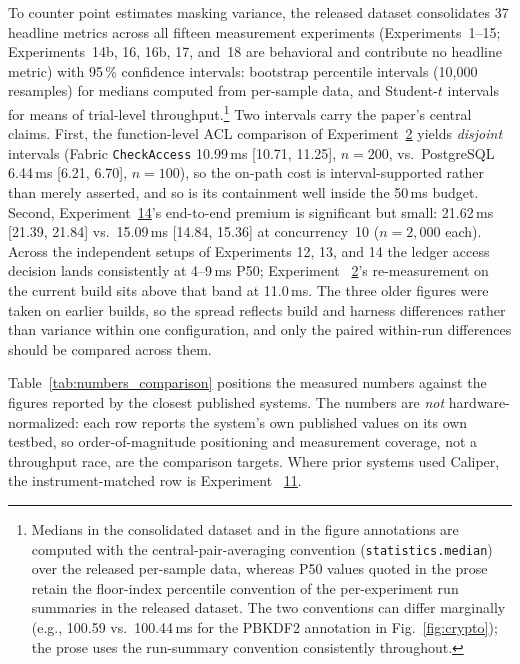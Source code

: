 \documentclass[preprint,12pt]{elsarticle}
\begin{document}
To counter point estimates masking variance, the released dataset
consolidates 37 headline metrics across all fifteen measurement
experiments (Experiments~1--15; Experiments~14b, 16, 16b, 17, and~18 are behavioral and
contribute no headline metric) with 95\,\% confidence intervals: bootstrap percentile intervals
(10{,}000 resamples) for medians computed from per-sample data, and
Student-$t$ intervals for means of trial-level
throughput.\footnote{Medians in the consolidated dataset and in the
figure annotations are computed with the
central-pair-averaging convention (\texttt{statistics.median}) over the
released per-sample data, whereas P50 values quoted in the prose retain
the floor-index percentile convention of the per-experiment run
summaries in the released dataset. The two conventions can differ marginally (e.g.,
100.59 vs.\ 100.44\,ms for the PBKDF2 annotation in
Fig.~\ref{fig:crypto}); the prose uses the run-summary convention
consistently throughout.}
Two intervals carry the paper's central claims. First, the
function-level ACL comparison of Experiment~\hyperref[sec:exp_latency]{2}
yields \emph{disjoint} intervals (Fabric \texttt{CheckAccess}
10.99\,ms [10.71, 11.25], $n{=}200$, vs.\ PostgreSQL 6.44\,ms
[6.21, 6.70], $n{=}100$), so the on-path cost is interval-supported
rather than merely asserted, and so is its containment well inside the
50\,ms budget. Second,
Experiment~\hyperref[sec:exp_baseline]{14}'s end-to-end premium is
significant but small: 21.62\,ms [21.39, 21.84] vs.\ 15.09\,ms
[14.84, 15.36] at concurrency~10 ($n{=}2{,}000$ each). Across the
independent setups of Experiments 12, 13, and 14 the ledger access
decision lands consistently at 4--9\,ms P50; Experiment~%
\hyperref[sec:exp_latency]{2}'s re-measurement on the current build sits
above that band at 11.0\,ms. The three older figures were taken on
earlier builds, so the spread reflects build and harness differences
rather than variance within one configuration, and only the paired
within-run differences should be compared across them.

Table~\ref{tab:numbers_comparison} positions the measured numbers
against the figures reported by the closest published systems. The
numbers are \emph{not} hardware-normalized: each row
reports the system's own published values on its own testbed, so
order-of-magnitude positioning and measurement coverage, not a
throughput race, are the comparison targets. Where prior systems
used Caliper, the instrument-matched row is Experiment~%
\hyperref[sec:exp_caliper]{11}.
\end{document}
